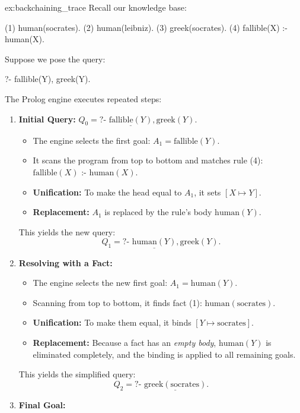 \begin{example}[Backchaining]{ex:backchaining_trace}
Recall our knowledge base:
\begin{codeblock}
(1) human(socrates).
(2) human(leibniz).
(3) greek(socrates).
(4) fallible(X) :- human(X).
\end{codeblock}
Suppose we pose the query:
\begin{codeblock}
?- fallible(Y), greek(Y).
\end{codeblock}
The Prolog engine executes repeated  steps:
\begin{enumerate}[label=\textbf{Step \arabic*:}, leftmargin=*]
    \item \textbf{Initial Query:} $Q_0 = \text{?- } \underline{\text{fallible}(Y)}, \text{greek}(Y).$
    \begin{itemize}
        \item The engine selects the first goal: $A_1 = \text{fallible}(Y)$.
        \item It scans the program from top to bottom and matches rule (4): $\text{fallible}(X) \text{ :- } \text{human}(X).$
        \item \textbf{Unification:} To make the head equal to $A_1$, it sets $[X \mapsto Y]$.
        \item \textbf{Replacement:} $A_1$ is replaced by the rule's body $\text{human}(Y)$.
    \end{itemize}
    This yields the new query:
    \[
    Q_1 = \text{?- } \underline{\text{human}(Y)}, \text{greek}(Y).
    \]
    \item \textbf{Resolving with a Fact:}
    \begin{itemize}
        \item The engine selects the new first goal: $A_1 = \text{human}(Y)$.
        \item Scanning from top to bottom, it finds fact (1): $\text{human}(\text{socrates}).$
        \item \textbf{Unification:} To make them equal, it binds $[Y \mapsto \text{socrates}]$.
        \item \textbf{Replacement:} Because a fact has an \textit{empty body}, $\text{human}(Y)$ is eliminated completely, and the binding is applied to all remaining goals.
    \end{itemize}
    This yields the simplified query:
    \[
    Q_2 = \text{?- } \underline{\text{greek}(\text{socrates})}.
    \]
    \item \textbf{Final Goal:}
    \begin{itemize}

\end{itemize}
\end{enumerate}
\end{example}

